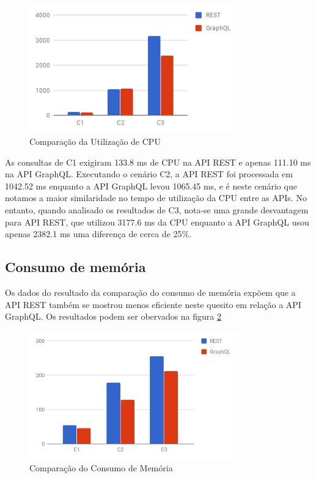 \begin{figure}[htbp]
    \centering
    \includegraphics[width=0.8\textwidth]{figuras/q1-cpu.png}
    \caption{Comparação da Utilização de CPU}
    \label{fig:q1-cpu}
    \author{fonte: Autor}
\end{figure}

As consultas de C1 exigiram 133.8 ms de CPU na API REST e apenas 111.10 ms na API GraphQL. Executando o cenário C2, a API REST foi processada em 1042.52 ms enquanto a API GraphQL levou 1065.45 ms, e é neste cenário que notamos a maior similaridade no tempo de utilização da CPU entre as APIs. No entanto, quando analisado os resultados de C3, nota-se uma grande desvantagem para API REST, que utilizou 3177.6 ms da CPU enquanto a API GraphQL usou apenas 2382.1 ms uma diferença de cerca de 25\%.
    
\subsection{Consumo de memória}

Os dados do resultado da comparação do consumo de memória expõem que a API REST também se mostrou menos eficiente neste quesito em relação a API GraphQL. Os resultados podem ser obervados na figura \ref{fig:q1-mem}

\begin{figure}[htbp]
    \centering
    \includegraphics[width=0.8\textwidth]{figuras/q1-memory.png}
    \caption{Comparação do Consumo de Memória}
    \label{fig:q1-mem}
    \author{fonte: Autor}
\end{figure}

